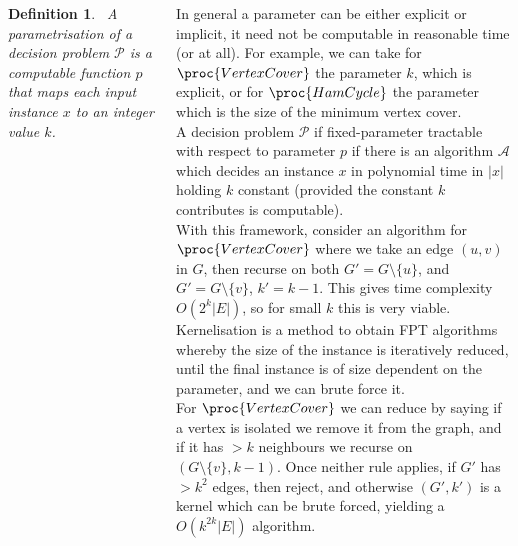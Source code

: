 \documentclass{tikzposter} %
\newtheorem{definition}{Definition}
\begin{document}
\begin{columns}
{    \begin{definition}
    \ A parametrisation of a decision problem $\mathcal{P}$ is a computable function $p$ that maps each input instance $x$ to an integer value $k$.
    \end{definition}
    \hphantom{}

    In general a parameter can be either explicit or implicit, it need not be computable in reasonable time (or at all). For example, we can take for $\proc{VertexCover}$ the parameter $k$, which is explicit, or for $\proc{HamCycle}$ the parameter which is the size of the minimum vertex cover. \\

    A decision problem $\mathcal{P}$ if fixed-parameter tractable with respect to parameter $p$ if there is an algorithm $\mathcal{A}$ which decides an instance $x$ in polynomial time in $|x|$ holding $k$ constant (provided the constant $k$ contributes is computable). \\

    With this framework, consider an algorithm for $\proc{VertexCover}$ where we take an edge $(u,v)$ in $G$, then recurse on both $G' = G \setminus \{u\}$, and $G' = G \setminus \{v\}$, $k' = k-1$. This gives time complexity $O(2^{k}|E|)$, so for small $k$ this is very viable. \\

    Kernelisation is a method to obtain FPT algorithms whereby the size of the instance is iteratively reduced, until the final instance is of size dependent on the parameter, and we can brute force it. \\

    For $\proc{VertexCover}$ we can reduce by saying if a vertex is isolated we remove it from the graph, and if it has $> k$ neighbours we recurse on $(G \setminus \{v\}, k-1)$. Once neither rule applies, if $G'$ has $> k^{2}$ edges, then reject, and otherwise $(G', k')$ is a kernel which can be brute forced, yielding a $O(k^{2k}|E|)$ algorithm.
  }


\end{columns}
\end{document}
